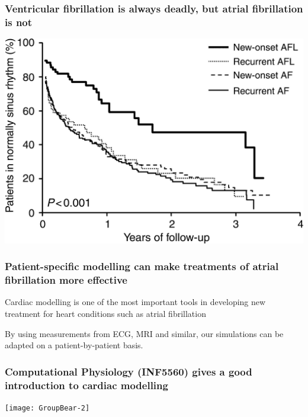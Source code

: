 \documentclass[norsk, 12pt]{beamer}
\begin{document}
\begin{frame}[fragile]
\frametitle{Ventricular fibrillation is always deadly, but atrial fibrillation is not}


\vspace{1cm}


\vspace{1cm}

\end{frame}

\begin{frame}[fragile]
\begin{center}
\includegraphics[width=\textwidth]{relapse}
\end{center}
\end{frame}

\begin{frame}[fragile]
\frametitle{Patient-specific modelling can make treatments of atrial fibrillation more effective}

Cardiac modelling is one of the most important tools in developing new treatment for heart conditions such as atrial fibrillation

\vspace{1cm}

 {
By using measurements from ECG, MRI and similar, our simulations can be adapted on a patient-by-patient basis.
}
\end{frame}

\begin{frame}[fragile]
\frametitle{Computational Physiology (INF5560) gives a good introduction to cardiac modelling}

\begin{center}
\texttt{[image: GroupBear-2]}	
\end{center}
\end{frame}
\end{document}
